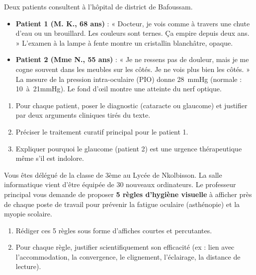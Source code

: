 \documentclass[11pt]{article}
\newcounter{popsec}
\newcounter{popsub}
\newcommand{\courssub}[1]{%
  \stepcounter{popsub}%
  \par\vspace{9pt}\noindent{\popxbold\fontsize{11.5}{13}\selectfont\color{popink}{\color{poporange}\thepopsec.\thepopsub}\hspace{6pt}#1}\par\nopagebreak\vspace{4pt}
}
\begin{document}
\begin{exercice}
Deux patients consultent à l'hôpital de district de Bafoussam.
\begin{itemize}
\item \textbf{Patient 1 (M. K., 68 ans)} : « Docteur, je vois comme à travers une chute d'eau ou un brouillard. Les couleurs sont ternes. Ça empire depuis deux ans. » L'examen à la lampe à fente montre un cristallin blanchâtre, opaque.
\item \textbf{Patient 2 (Mme N., 55 ans)} : « Je ne ressens pas de douleur, mais je me cogne souvent dans les meubles sur les côtés. Je ne vois plus bien les côtés. » La mesure de la pression intra-oculaire (PIO) donne \SI{28}{mmHg} (normale : \SI{10}{à 21}{mmHg}). Le fond d'œil montre une atteinte du nerf optique.
\end{itemize}
\begin{enumerate}
\item Pour chaque patient, poser le diagnostic (cataracte ou glaucome) et justifier par deux arguments cliniques tirés du texte.
\item Préciser le traitement curatif principal pour le patient 1.
\item Expliquer pourquoi le glaucome (patient 2) est une urgence thérapeutique même s'il est indolore.
\end{enumerate}
\end{exercice}

\begin{exercice}
Vous êtes délégué de la classe de 3ème au Lycée de Nkolbisson. La salle informatique vient d'être équipée de 30 nouveaux ordinateurs. Le professeur principal vous demande de proposer \textbf{5 règles d'hygiène visuelle} à afficher près de chaque poste de travail pour prévenir la fatigue oculaire (asthénopie) et la myopie scolaire.
\begin{enumerate}
\item Rédiger ces 5 règles sous forme d'affiches courtes et percutantes.
\item Pour chaque règle, justifier scientifiquement son efficacité (ex : lien avec l'accommodation, la convergence, le clignement, l'éclairage, la distance de lecture).
\end{enumerate}
\end{exercice}

\courssub{Je me prépare au BEPC}
\end{document}
